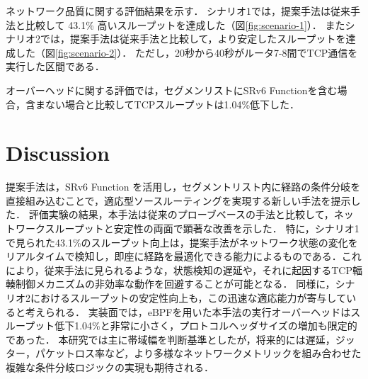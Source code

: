 \documentclass[conference]{IEEEtran}
\begin{document}
ネットワーク品質に関する評価結果を示す．
シナリオ1では，提案手法は従来手法と比較して 43.1\% 高いスループットを達成した（図\ref{fig:scenario-1}）．
またシナリオ2では，提案手法は従来手法と比較して，より安定したスループットを達成した（図\ref{fig:scenario-2}）．
ただし，20秒から40秒がルータ7-8間でTCP通信を実行した区間である．

オーバーヘッドに関する評価では，セグメンリストにSRv6 Functionを含む場合，含まない場合と比較してTCPスループットは1.04\%低下した．


\section{Discussion}

提案手法は，SRv6 Function を活用し，セグメントリスト内に経路の条件分岐を直接組み込むことで，適応型ソースルーティングを実現する新しい手法を提示した．
評価実験の結果，本手法は従来のプローブベースの手法と比較して，ネットワークスループットと安定性の両面で顕著な改善を示した．
特に，シナリオ1で見られた43.1\%のスループット向上は，提案手法がネットワーク状態の変化をリアルタイムで検知し，即座に経路を最適化できる能力によるものである．これにより，従来手法に見られるような，状態検知の遅延や，それに起因するTCP輻輳制御メカニズムの非効率な動作を回避することが可能となる．
同様に，シナリオ2におけるスループットの安定性向上も，この迅速な適応能力が寄与していると考えられる．
実装面では，eBPFを用いた本手法の実行オーバーヘッドはスループット低下1.04\%と非常に小さく，プロトコルヘッダサイズの増加も限定的であった．
本研究では主に帯域幅を判断基準としたが，将来的には遅延，ジッター，パケットロス率など，より多様なネットワークメトリックを組み合わせた複雑な条件分岐ロジックの実現も期待される．
\end{document}
